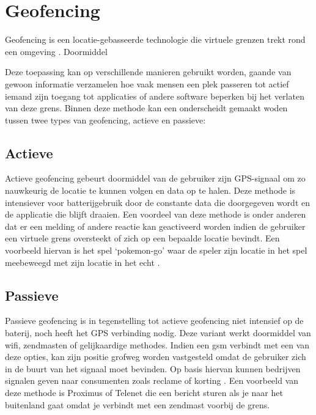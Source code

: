 \section{Geofencing}  %
Geofencing is een locatie-gebasseerde technologie die virtuele grenzen trekt rond een omgeving \autocite{Hoffman2022}. Doormiddel



Deze toepassing kan op verschillende manieren gebruikt worden, gaande van gewoon informatie verzamelen hoe vaak mensen een plek passeren tot actief iemand zijn toegang tot applicaties of andere software beperken bij het verlaten van deze grens. Binnen deze methode kan een onderscheidt gemaakt woden tussen twee types van geofencing, actieve en passieve:

\subsection{Actieve}
Actieve geofencing gebeurt doormiddel van de gebruiker zijn GPS-signaal om zo nauwkeurig de locatie te kunnen volgen en data op te halen. Deze methode is intensiever voor batterijgebruik door de constante data die doorgegeven wordt en de applicatie die blijft draaien. Een voordeel van deze methode is onder anderen dat er een melding of andere reactie kan geactiveerd worden indien de gebruiker een virtuele grens oversteekt of zich op een bepaalde locatie bevindt. Een voorbeeld hiervan is het spel `pokemon-go' waar de speler zijn locatie in het spel meebeweegd met zijn locatie in het echt \autocite{Hoffman2022}.

\subsection{Passieve}
Passieve geofencing is in tegenstelling tot actieve geofencing niet intensief op de baterij, noch heeft het GPS verbinding nodig. Deze variant werkt doormiddel van wifi, zendmasten of gelijkaardige methodes. Indien een gsm verbindt met een van deze opties, kan zijn positie grofweg worden vastgesteld omdat de gebruiker zich in de buurt van het signaal moet bevinden. Op basis hiervan kunnen bedrijven signalen geven naar consumenten zoals reclame of korting \autocite{Hoffman2022}. Een voorbeeld van deze methode is Proximus of Telenet die een bericht sturen als je naar het buitenland gaat omdat je verbindt met een zendmast voorbij de grens.



